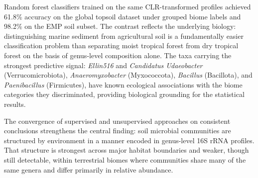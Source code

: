 \documentclass[12pt, oneside]{report}
\begin{document}
Random forest classifiers trained on the same CLR-transformed profiles achieved 61.8\% accuracy on the global topsoil dataset under grouped biome labels and 98.2\% on the EMP soil subset. The contrast reflects the underlying biology: distinguishing marine sediment from agricultural soil is a fundamentally easier classification problem than separating moist tropical forest from dry tropical forest on the basis of genus-level composition alone. The taxa carrying the strongest predictive signal: \textit{Ellin516} and \textit{Candidatus Udaeobacter} (Verrucomicrobiota), \textit{Anaeromyxobacter} (Myxococcota), \textit{Bacillus} (Bacillota), and \textit{Paenibacillus} (Firmicutes), have known ecological associations with the biome categories they discriminated, providing biological grounding for the statistical results.

The convergence of supervised and unsupervised approaches on consistent conclusions strengthens the central finding: soil microbial communities are structured by environment in a manner encoded in genus-level 16S rRNA profiles. That structure is strongest across major habitat boundaries and weaker, though still detectable, within terrestrial biomes where communities share many of the same genera and differ primarily in relative abundance.

\newpage
{}
\end{document}
